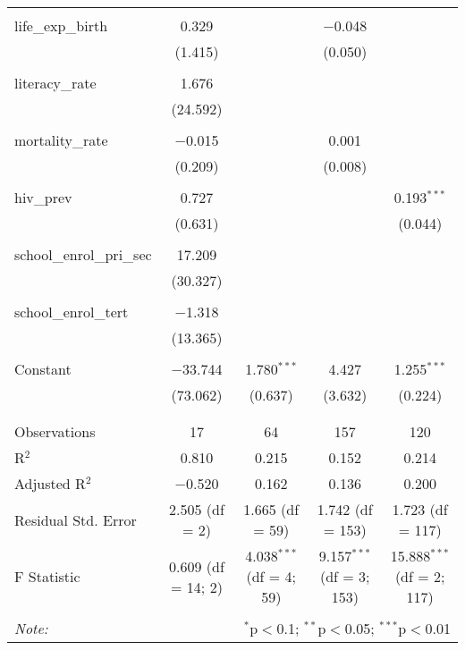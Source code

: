 \begin{table}[!htbp]
\begin{tabular}{@{\extracolsep{5pt}}lcccc}
  & & & & \\ 
 life\_exp\_birth & 0.329 &  & $-$0.048 &  \\ 
  & (1.415) &  & (0.050) &  \\ 
  & & & & \\ 
 literacy\_rate & 1.676 &  &  &  \\ 
  & (24.592) &  &  &  \\ 
  & & & & \\ 
 mortality\_rate & $-$0.015 &  & 0.001 &  \\ 
  & (0.209) &  & (0.008) &  \\ 
  & & & & \\ 
 hiv\_prev & 0.727 &  &  & 0.193$^{***}$ \\ 
  & (0.631) &  &  & (0.044) \\ 
  & & & & \\ 
 school\_enrol\_pri\_sec & 17.209 &  &  &  \\ 
  & (30.327) &  &  &  \\ 
  & & & & \\ 
 school\_enrol\_tert & $-$1.318 &  &  &  \\ 
  & (13.365) &  &  &  \\ 
  & & & & \\ 
 Constant & $-$33.744 & 1.780$^{***}$ & 4.427 & 1.255$^{***}$ \\ 
  & (73.062) & (0.637) & (3.632) & (0.224) \\ 
  & & & & \\ 
\hline \\[-1.8ex] 
Observations & 17 & 64 & 157 & 120 \\ 
R$^{2}$ & 0.810 & 0.215 & 0.152 & 0.214 \\ 
Adjusted R$^{2}$ & $-$0.520 & 0.162 & 0.136 & 0.200 \\ 
Residual Std. Error & 2.505 (df = 2) & 1.665 (df = 59) & 1.742 (df = 153) & 1.723 (df = 117) \\ 
F Statistic & 0.609 (df = 14; 2) & 4.038$^{***}$ (df = 4; 59) & 9.157$^{***}$ (df = 3; 153) & 15.888$^{***}$ (df = 2; 117) \\ 
\hline 
\hline \\[-1.8ex] 
\textit{Note:}  & \multicolumn{4}{r}{$^{*}$p$<$0.1; $^{**}$p$<$0.05; $^{***}$p$<$0.01} \\ 
\end{tabular} 
\end{table} 
